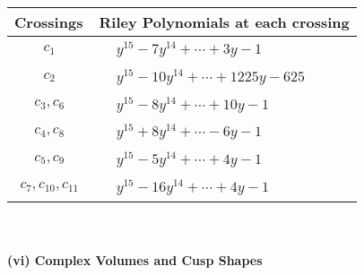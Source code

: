 \documentclass[1p]{elsarticle_modified}
\theoremstyle{definition}
\begin{document}
\begin{tabular}{m{50pt}|m{274pt}}
Crossings & \hspace{64pt}Riley Polynomials at each crossing \\
\hline $$\begin{aligned}c_{1}\end{aligned}$$&$\begin{aligned}
&y^{15}-7 y^{14}+\cdots+3 y-1
\end{aligned}$\\
\hline $$\begin{aligned}c_{2}\end{aligned}$$&$\begin{aligned}
&y^{15}-10 y^{14}+\cdots+1225 y-625
\end{aligned}$\\
\hline $$\begin{aligned}c_{3},c_{6}\end{aligned}$$&$\begin{aligned}
&y^{15}-8 y^{14}+\cdots+10 y-1
\end{aligned}$\\
\hline $$\begin{aligned}c_{4},c_{8}\end{aligned}$$&$\begin{aligned}
&y^{15}+8 y^{14}+\cdots-6 y-1
\end{aligned}$\\
\hline $$\begin{aligned}c_{5},c_{9}\end{aligned}$$&$\begin{aligned}
&y^{15}-5 y^{14}+\cdots+4 y-1
\end{aligned}$\\
\hline $$\begin{aligned}c_{7},c_{10},c_{11}\end{aligned}$$&$\begin{aligned}
&y^{15}-16 y^{14}+\cdots+4 y-1
\end{aligned}$\\
\hline
\end{tabular}\\~\\
\newpage\flushleft \textbf{(vi) Complex Volumes and Cusp Shapes}
\end{document}

